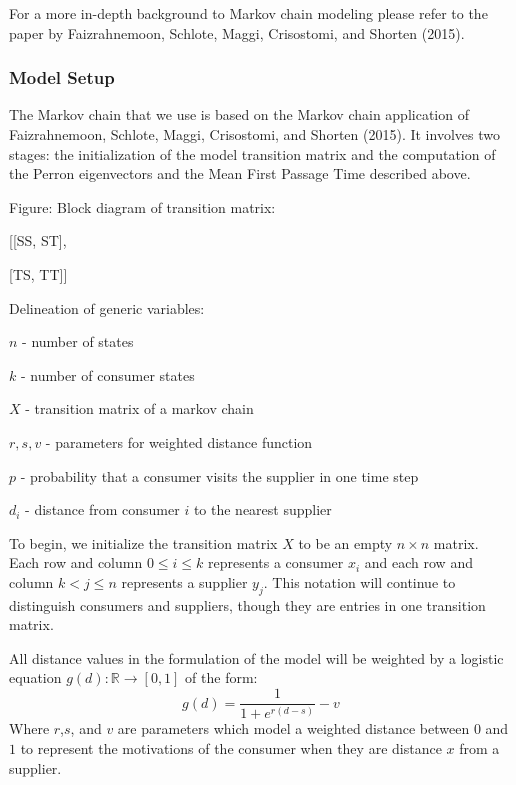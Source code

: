 \documentclass[twoside,twocolumn]{article}
\begin{document}
For a more in-depth background to Markov chain modeling please refer to the paper by Faizrahnemoon, Schlote, Maggi, Crisostomi, and Shorten (2015).


\subsubsection{Model Setup}

The Markov chain that we use is based on the Markov chain application of Faizrahnemoon, Schlote, Maggi, Crisostomi, and Shorten (2015).
It involves two stages: the initialization of the model transition matrix and the computation of the Perron eigenvectors and the Mean First Passage Time described above.


Figure: Block diagram of transition matrix:

[[SS, ST],

  [TS, TT]]



Delineation of generic variables:

$n$ - number of states

$k$ - number of consumer states

$X$ - transition matrix of a markov chain

$r, s, v$ - parameters for weighted distance function

$p$ - probability that a consumer visits the supplier in one time step

$d_{i}$ - distance from consumer $i$ to the nearest supplier

To begin, we initialize the transition matrix $X$ to be an empty $n \times n$ matrix.
Each row and column $0 \leq i \leq k$ represents a consumer $x_i$ and each row and column $k < j \leq n$ represents a supplier $y_j$.
This notation will continue to distinguish consumers and suppliers, though they are entries in one transition matrix. %

All distance values in the formulation of the model will be weighted by a logistic equation $g(d): \mathbb{R} \rightarrow [0,1]$ of the form:
$$g(d) = \frac{1}{1 + e^{r(d-s)}} - v$$
Where $r$,$s$, and $v$ are parameters which model  a weighted distance between $0$ and $1$ to represent the motivations of the consumer when they are distance $x$ from a supplier. %
\end{document}
